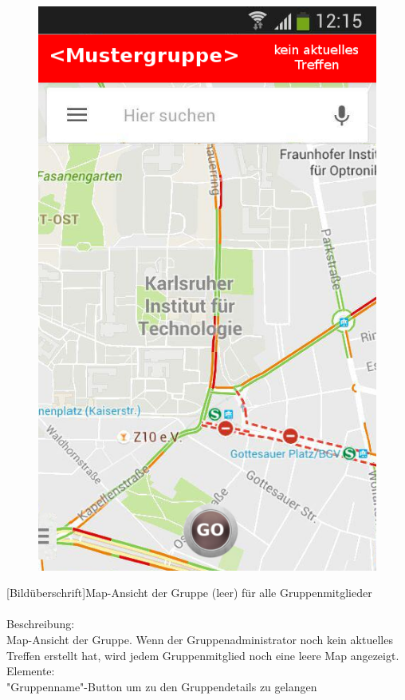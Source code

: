 \begin{figure}
	\includegraphics[scale =1]{resources/images/map_leer.png}
\end{figure}
[Bildüberschrift]Map-Ansicht der Gruppe (leer) für alle Gruppenmitglieder\\ \\
[Kleinüberschrift]Beschreibung:\\
Map-Ansicht der Gruppe. Wenn der Gruppenadministrator noch kein aktuelles Treffen erstellt hat, wird jedem Gruppenmitglied noch eine leere Map angezeigt.\\
[Kleinüberschrift]Elemente:\\
"Gruppenname"-Button um zu den Gruppendetails zu gelangen\\

